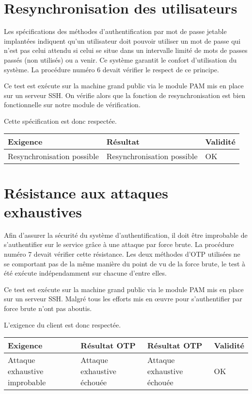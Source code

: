 \documentclass{"../../res/univ-projet"}
\begin{document}
	\section{Resynchronisation des utilisateurs}
	Les spécifications des méthodes d'authentification par mot de passe jetable implantées indiquent qu'un
	utilisateur doit pouvoir utiliser un mot de passe qui n'est pas celui attendu si celui se situe dans un 
	intervalle limité de mots de passes passés (non utilisés) ou a venir. Ce système garantit le confort
	d'utilisation du système. La procédure numéro 6 devait vérifier le respect de ce principe.
	
	Ce test est exécute sur la machine grand public via le module PAM mis en place sur un serveur SSH. On 
	vérifie alors que la fonction de resynchronisation est bien fonctionnelle sur notre module de vérification.

	Cette spécification est donc respectée.
	\begin{center}	
		\begin{tabular}{| p{6cm} | p{6cm} | p{2cm} |}
			\hline
			\cellcolor{lightgray} Exigence & \cellcolor{lightgray} Résultat & 
			\cellcolor{lightgray} Validité \\ \hline
		
			Resynchronisation possible & Resynchronisation possible & \cellcolor{green} OK \\ \hline
		\end{tabular}
	\end{center}
	
	\section{Résistance aux attaques exhaustives}
	Afin d'assurer la sécurité du système d'authentification, il doit être improbable de s'authentifier sur le 
	service grâce à une attaque par force brute. La procédure numéro 7 devait vérifier cette résistance. Les
	deux méthodes d'OTP utilisées ne se	comportant pas de la même manière du point de vu de la force brute, le
	test à été exécute indépendamment sur chacune d'entre elles.
	
	Ce test est exécute sur la machine grand public via le module PAM mis en place sur un serveur SSH. Malgré 
	tous les efforts mis en œuvre pour s'authentifier par force brute n'ont pas aboutis.
	
	L'exigence du client est donc respectée.
	\begin{center}	
		\begin{tabular}{| p{4cm} | p{4cm} | p{4cm} | p{2cm} |}
			\hline
			\cellcolor{lightgray} Exigence & \cellcolor{lightgray} Résultat OTP & 
			\cellcolor{lightgray} Résultat OTP & \cellcolor{lightgray} Validité \\ \hline
		
			Attaque exhaustive improbable & Attaque exhaustive échouée & Attaque exhaustive échouée &
			\cellcolor{green} OK \\ \hline
		\end{tabular}
	\end{center}
    
\end{document}
